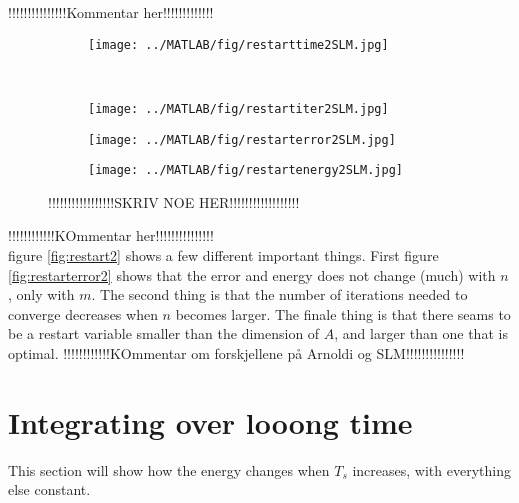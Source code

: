 !!!!!!!!!!!!!!!Kommentar her!!!!!!!!!!!!!\\
\begin{figure}[H]
        \centering
        \begin{subfigure}[b]{0.45\textwidth}
                \texttt{[image: ../MATLAB/fig/restarttime2SLM.jpg]}
                \caption{  }
                \label{fig:restarttime2SLM}
        \end{subfigure}
        ~
        \begin{subfigure}[b]{0.45\textwidth}
                \texttt{[image: ../MATLAB/fig/restartiter2SLM.jpg]}
                \caption{  }
                \label{fig:restartiter2SLM}
        \end{subfigure}
        \begin{subfigure}[b]{0.45\textwidth}
                \texttt{[image: ../MATLAB/fig/restarterror2SLM.jpg]}
                \caption{  }
                \label{fig:restarterror2SLM}
        \end{subfigure}
        \begin{subfigure}[b]{0.45\textwidth}
                \texttt{[image: ../MATLAB/fig/restartenergy2SLM.jpg]}
                \caption{  }
                \label{fig:restartenergy2SLM}
        \end{subfigure}
        \caption{ !!!!!!!!!!!!!!!!!SKRIV NOE HER!!!!!!!!!!!!!!!!!!  }
        \label{fig:restart2SLM}
\end{figure}
!!!!!!!!!!!!KOmmentar her!!!!!!!!!!!!!!!\\
figure \ref{fig:restart2} shows a few different important things. First figure \ref{fig:restarterror2} shows that the error and energy does not change (much) with $n$, only with $m$. The second thing is that the number of iterations needed to converge decreases when $n$ becomes larger. The finale thing is that there seams to be a restart variable smaller than the dimension of $A$, and larger than one that is optimal. 
!!!!!!!!!!!!KOmmentar om forskjellene på Arnoldi og SLM!!!!!!!!!!!!!!!\\
\section{Integrating over looong time}%
This section will show how the energy changes when $T_s$ increases, with everything else constant.
